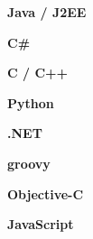 \documentclass[a4paper,landscape,MMMyyyy,nonstopmode]{resumecv}
\begin{document}
\begin{minipage}{0.25\textwidth}
    \begin{minipage}[b][0.33\textheight][b]{\textwidth\UseNoteFont}
        \begin{skillbox}{0.9}
            \textbf{Java / J2EE}
        \end{skillbox}
        \begin{skillbox}{0.81}
            \textbf{C\#}
        \end{skillbox}
        \begin{skillbox}{0.9}
            \textbf{C / C++}
        \end{skillbox}
        \begin{skillbox}{0.36}
            \textbf{Python}
        \end{skillbox}
        \begin{skillbox}{0.54}
            \textbf{.NET}
        \end{skillbox}
        \begin{skillbox}{0.18}
            \textbf{groovy}
        \end{skillbox}
        \begin{skillbox}{0.27}
            \textbf{Objective-C}
        \end{skillbox}
        \begin{skillbox}{0.9}
            \textbf{JavaScript}
        \end{skillbox}
    \end{minipage}
\end{minipage}%
\end{document}
